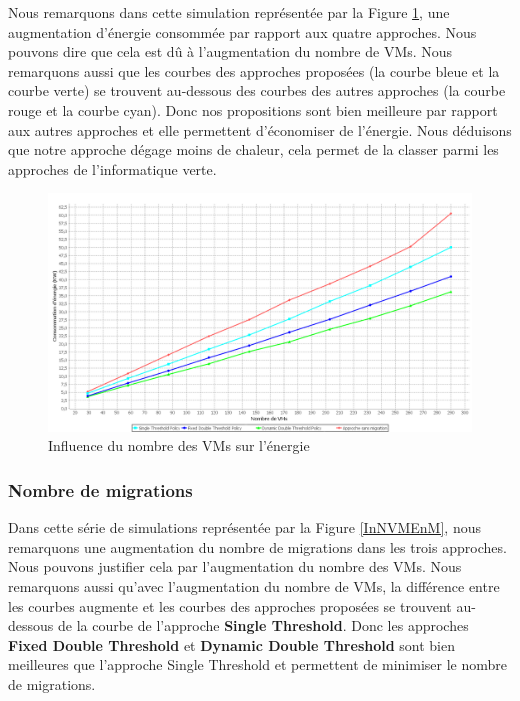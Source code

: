\begin{onehalfspace}
Nous remarquons dans cette simulation représentée par la Figure \ref{InNVMEn}, une augmentation d’énergie consommée par rapport aux quatre approches. Nous pouvons dire que cela est dû à l’augmentation du nombre de VMs. Nous remarquons aussi que les courbes des approches proposées (la courbe bleue et la courbe verte) se trouvent au-dessous des courbes des autres approches (la courbe rouge et la courbe cyan). Donc nos propositions sont bien meilleure par rapport aux autres approches et elle permettent d’économiser de l’énergie. Nous déduisons que notre approche dégage moins de chaleur, cela permet de la  classer  parmi les approches de l'informatique verte. 

\begin{figure}[!h]
\begin{center}
\includegraphics[scale=0.35]{figures/sh1.png} 
\end{center}
\caption{Influence du nombre des VMs sur l’énergie}
\label{InNVMEn}
\end{figure}


\subsubsection{Nombre de migrations}
Dans cette série de simulations représentée par la Figure \ref{InNVMEnM}, nous remarquons  une augmentation du nombre de migrations dans les  trois approches. Nous pouvons justifier cela par l’augmentation du nombre des VMs.
Nous remarquons aussi qu’avec l’augmentation du nombre de VMs, la différence entre les courbes augmente et les courbes des approches proposées se trouvent au-dessous de la courbe de l’approche \textbf{Single Threshold}. Donc les approches \textbf{Fixed Double Threshold} et \textbf{Dynamic Double Threshold} sont bien meilleures que l’approche Single Threshold et permettent de minimiser le nombre de migrations.


\end{onehalfspace}

